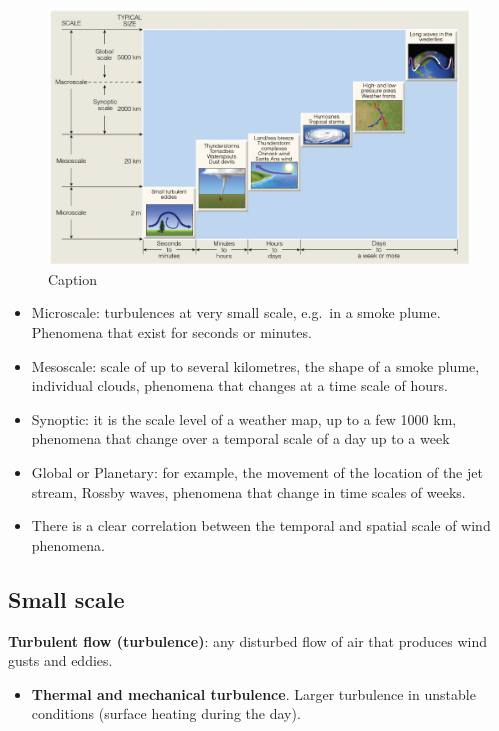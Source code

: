 \documentclass[12pt,oneside]{book}
\providecommand{\tightlist}{%
  \setlength{\itemsep}{0pt}\setlength{\parskip}{0pt}}
\begin{document}
\begin{figure}

{\centering \includegraphics[width=0.8\linewidth]{figures/Figure417} 

}

\caption{Caption}\label{fig:scales}
\end{figure}

\begin{itemize}
\tightlist
\item
  Microscale: turbulences at very small scale, e.g.~in a smoke plume.
  Phenomena that exist for seconds or minutes.\\
\item
  Mesoscale: scale of up to several kilometres, the shape of a smoke
  plume, individual clouds, phenomena that changes at a time scale of
  hours.
\item
  Synoptic: it is the scale level of a weather map, up to a few 1000 km,
  phenomena that change over a temporal scale of a day up to a week\\
\item
  Global or Planetary: for example, the movement of the location of the
  jet stream, Rossby waves, phenomena that change in time scales of
  weeks.
\item
  There is a clear correlation between the temporal and spatial scale of
  wind phenomena.
\end{itemize}

\subsection{Small scale}\label{small-scale}

\textbf{Turbulent flow (turbulence)}: any disturbed flow of air that
produces wind gusts and eddies.

\begin{itemize}
\tightlist
\item
  \textbf{Thermal and mechanical turbulence}. Larger turbulence in
  unstable conditions (surface heating during the day).
\end{itemize}
\end{document}
